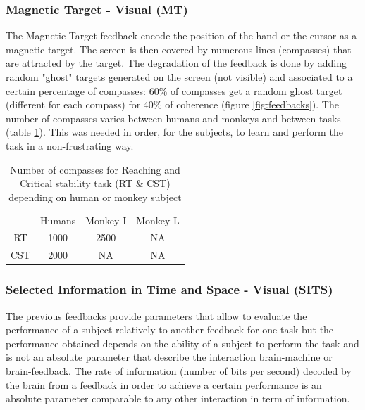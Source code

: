 \documentclass[preprint,12pt]{elsarticle}
\begin{document}
\subsubsection{Magnetic Target - Visual (MT)}
The Magnetic Target feedback encode the position of the hand or the cursor as a magnetic target. The screen is then covered by numerous lines (compasses) that are attracted by the target. The degradation of the feedback is done by adding random "ghost" targets generated on the screen (not visible) and associated to a certain percentage of compasses: 60\% of compasses get a random ghost target (different for each compass) for 40\% of coherence (figure \ref{fig:feedbacks}). The number of compasses varies between humans and monkeys and between tasks (table \ref{table:lines}). This was needed in order, for the subjects, to learn and perform the task in a non-frustrating way.
\begin{table}
\begin{center}
\begin{tabular}{ |c|c|c|c| } 
 \hline
  & Humans & Monkey I & Monkey L \\ 
 RT & 1000 & 2500 & NA \\ 
 CST & 2000 & NA & NA \\ 
 \hline
\end{tabular}
\end{center}
\caption{Number of compasses for Reaching and Critical stability task (RT \& CST) depending on human or monkey subject}
\label{table:lines}
\end{table}

\subsubsection{Selected Information in Time and Space - Visual (SITS)}
The previous feedbacks provide parameters that allow to evaluate the performance of a subject relatively to another feedback for one task but the performance obtained depends on the ability of a subject to perform the task and is not an absolute parameter that describe the interaction brain-machine or brain-feedback. The rate of information (number of bits per second) decoded by the brain from a feedback in order to achieve a certain performance is an absolute parameter comparable to any other interaction in term of information.
\end{document}
